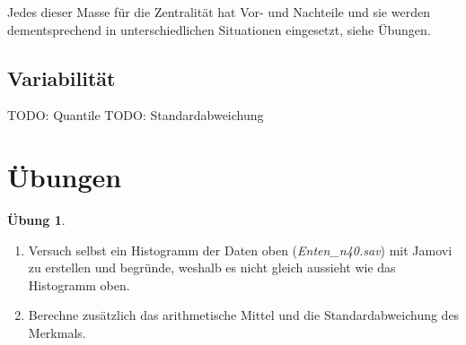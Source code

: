 \documentclass[
]{book}
\providecommand{\tightlist}{%
  \setlength{\itemsep}{0pt}\setlength{\parskip}{0pt}}
\theoremstyle{definition}
\theoremstyle{definition}
\theoremstyle{definition}
\newtheorem{exercise}{Übung}[chapter]
\theoremstyle{definition}
\theoremstyle{remark}
\begin{document}
Jedes dieser Masse für die Zentralität hat Vor- und Nachteile und sie werden dementsprechend in unterschiedlichen Situationen eingesetzt, siehe Übungen.

\subsection{Variabilität}\label{variabilituxe4t}

TODO: Quantile
TODO: Standardabweichung

\section{Übungen}\label{uxfcbungen}

\begin{exercise}
\protect\hypertarget{exr:enten-hist-mean-sd}{}\label{exr:enten-hist-mean-sd}\leavevmode

\begin{enumerate}
\def\labelenumi{(\alph{enumi})}
\tightlist
\item
  Versuch selbst ein Histogramm der Daten oben (\emph{Enten\_n40.sav}) mit Jamovi zu erstellen und begründe, weshalb es nicht gleich aussieht wie das Histogramm oben.
\item
  Berechne zusätzlich das arithmetische Mittel und die Standardabweichung des Merkmals.
\end{enumerate}

\end{exercise}
\end{document}
